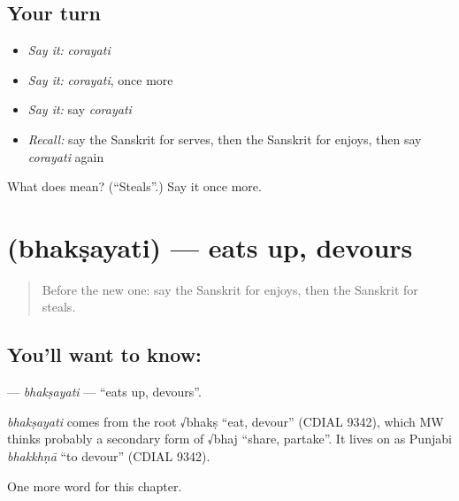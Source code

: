 \subsection*{Your turn}
\begin{itemize}
\raggedright
  \item \emph{Say it:} \emph{corayati}
  \item \emph{Say it:} \emph{corayati}, once more
  \item \emph{Say it:} say \emph{corayati}
  \item \emph{Recall:} say the Sanskrit for serves, then the Sanskrit for enjoys, then say \emph{corayati} again
\end{itemize}

\begin{tcolorbox}[breakable,colback=teal!4,colframe=teal!35!black,title={Before you move on}]
What does  mean? (\textquotedblleft{}Steals\textquotedblright{}.) Say it once more.
\end{tcolorbox}
\section[\texorpdfstring{\sk{भक्षयति} (bhakṣayati)}{भक्षयति (bhakṣayati)}]{ (bhakṣayati) — eats up, devours}

\label{lesson:SA-C174-bhaksayati}



\begin{quote}
Before the new one: say the Sanskrit for enjoys, then the Sanskrit for steals.
\end{quote}

\subsection*{You'll want to know: }
\textbf{} — \emph{bhakṣayati} — \textquotedblleft{}eats up, devours\textquotedblright{}.

\begin{cousinweb}
\emph{bhakṣayati} comes from the root √bhakṣ \textquotedblleft{}eat, devour\textquotedblright{} (CDIAL 9342), which MW thinks probably a secondary form of √bhaj \textquotedblleft{}share, partake\textquotedblright{}. It lives on as Punjabi \emph{bhakkhṇā} \textquotedblleft{}to devour\textquotedblright{} (CDIAL 9342).
\end{cousinweb}

\begin{grammarlens}[title={What you've built}]
One more word for this chapter.
\end{grammarlens}

